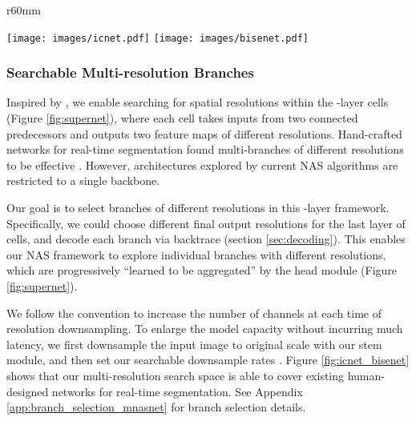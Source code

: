 \documentclass{article} \usepackage{iclr2020_conference,times}
\begin{document}
\begin{wrapfigure}{r}{60mm}
\vspace{-2em}
\begin{center}
	\label{subfig:icnet}
	\texttt{[image: images/icnet.pdf]}
\hfill
	\label{subfig:bisenet}
	\texttt{[image: images/bisenet.pdf]}
\caption{{\small Our multi-resolution search space covers existing manual designs for real-time segmentation (unused cells omitted). Top: ICNet \citep{zhao2018icnet}. Bottom: BiSeNet \citep{yu2018bisenet}}}\label{fig:icnet_bisenet}
\vspace{-2em}
\end{center}
\end{wrapfigure}
\vspace{-1.5em}

\subsubsection{Searchable Multi-resolution Branches}\vspace{-0.5em}

Inspired by \citep{liu2019auto}, we enable searching for spatial resolutions within the -layer cells (Figure \ref{fig:supernet}), where each cell takes inputs from two connected predecessors and outputs two feature maps of different resolutions. Hand-crafted networks for real-time segmentation found multi-branches of different resolutions to be effective \citep{zhao2018icnet,yu2018bisenet}. However, architectures explored by current NAS algorithms are restricted to a single backbone.

Our goal is to select   branches of different resolutions in this -layer framework. Specifically, we could choose  different final output resolutions for the last layer of cells, and decode each branch via backtrace (section \ref{sec:decoding}).
This enables our NAS framework to explore  individual branches with different resolutions, which are progressively ``learned to be aggregated'' by the head module (Figure \ref{fig:supernet}).

We follow the convention to increase the number of channels at each time of resolution downsampling. To enlarge the model capacity without incurring much latency, we first downsample the input image to  original scale with our stem module, and then set our searchable downsample rates . Figure \ref{fig:icnet_bisenet} shows that our multi-resolution search space is able to cover existing human-designed networks for real-time segmentation. See Appendix \ref{app:branch_selection_mnasnet} for branch selection details.
\end{document}
